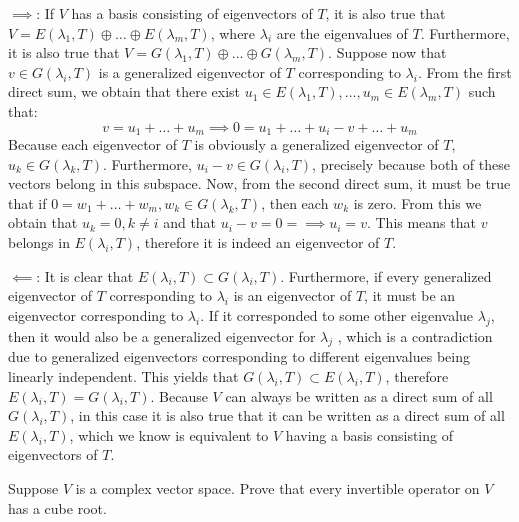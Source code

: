 \begin{solution}

    $\implies$: If $V$ has a basis consisting of eigenvectors of $T$, it is also true that $V = E(\lambda_1, T) \oplus \ldots \oplus E(\lambda_m, T)$, where $\lambda_i$ are the eigenvalues of $T$. Furthermore, it is also true that $V = G(\lambda_1, T) \oplus \ldots \oplus G(\lambda_m, T)$. Suppose now that $v \in G(\lambda_i, T)$ is a generalized eigenvector of $T$ corresponding to $\lambda_i$. From the first direct sum, we obtain that there exist $u_1 \in E(\lambda_1, T), \ldots, u_m \in E(\lambda_m, T)$ such that:
    $$v = u_1 + \ldots + u_m \implies 0 = u_1 + \ldots + u_i - v + \ldots + u_m$$
    Because each eigenvector of $T$ is obviously a generalized eigenvector of $T$, $u_k \in G(\lambda_k, T)$. Furthermore, $u_i - v \in G(\lambda_i, T)$, precisely because both of these vectors belong in this subspace. Now, from the second direct sum, it must be true that if $0 = w_1 + \ldots + w_m, w_k \in G(\lambda_k, T)$, then each $w_k$ is zero. From this we obtain that $u_k = 0, k \neq i$ and that $u_i -v = 0 =\implies u_i = v$. This means that $v$ belongs in $E(\lambda_i, T)$, therefore it is indeed an eigenvector of $T$.

    $\impliedby$: It is clear that $E(\lambda_i, T) \subset G(\lambda_i, T)$. Furthermore, if every generalized eigenvector of $T$ corresponding to $\lambda_i$ is an eigenvector of $T$, it must be an eigenvector corresponding to $\lambda_i$. If it corresponded to some other eigenvalue $\lambda_j$, then it would also be a generalized eigenvector for $\lambda_j$ , which is a contradiction due to generalized eigenvectors corresponding to different eigenvalues being linearly independent. This yields that $G(\lambda_i, T) \subset E(\lambda_i, T)$, therefore $E(\lambda_i, T) = G(\lambda_i, T)$. Because $V$ can always be written as a direct sum of all $G(\lambda_i, T)$, in this case it is also true that it can be written as a direct sum of all $E(\lambda_i, T)$, which we know is equivalent to $V$ having a basis consisting of eigenvectors of $T$.
\end{solution}

\begin{exercise}{7}
    Suppose $V$ is a complex vector space. Prove that every invertible operator on $V$ has a cube root.
\end{exercise}

